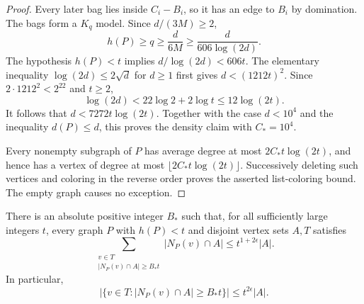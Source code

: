 \begin{proof}
Every later bag lies inside \(C_i-B_i\), so it has an edge to \(B_i\)
by domination. The bags form a \(K_q\) model. Since \(d/(3M)\ge2\),
\[
 h(P)\ge q\ge\frac{d}{6M}
 \ge\frac{d}{606\log(2d)}.
\]
The hypothesis \(h(P)<t\) implies \(d/\log(2d)<606t\).
The elementary inequality \(\log(2d)\le2\sqrt d\) for \(d\ge1\) first
gives \(d<(1212t)^2\). Since \(2\cdot1212^2<2^{22}\) and \(t\ge2\),
\[
 \log(2d)<22\log2+2\log t\le12\log(2t).
\]
It follows that \(d<7272t\log(2t)\). Together with the case \(d<10^4\)
and the inequality \(d(P)\le d\), this proves the density claim with
\(C_*=10^4\).

Every nonempty subgraph of \(P\) has average degree at most
\(2C_*t\log(2t)\), and hence has a vertex of degree at most
\(\lfloor2C_*t\log(2t)\rfloor\).
Successively deleting such vertices and coloring in the reverse order
proves the asserted list-coloring bound. The empty graph causes no exception.
\end{proof}

\begin{lemma}\label{lem:incidence}
There is an absolute positive integer \(B_*\) such that, for all sufficiently
large integers \(t\), every graph \(P\) with \(h(P)<t\) and disjoint vertex
sets \(A,T\) satisfies
\begin{equation}\label{density:incidence-bound}
 \sum_{\substack{v\in T\\ |N_P(v)\cap A|\ge B_*t}}
       |N_P(v)\cap A|
 \le t^{1+2\epsilon}|A|.
\end{equation}
In particular,
\[
 \bigl|\{v\in T:|N_P(v)\cap A|\ge B_*t\}\bigr|
 \le t^{2\epsilon}|A|.
\]
\end{lemma}

